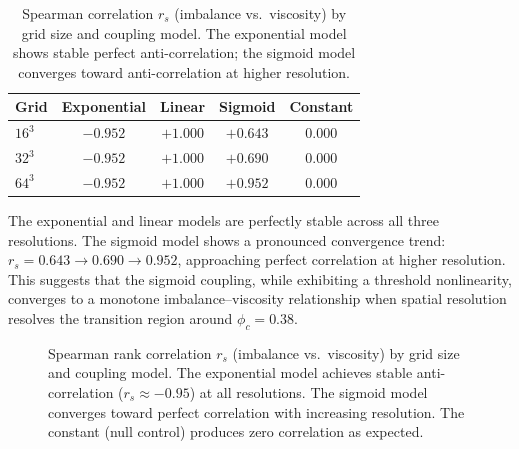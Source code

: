 \documentclass[12pt]{article}
\theoremstyle{definition}
\theoremstyle{plain}
\theoremstyle{remark}
\begin{document}
\begin{table}[htbp]
\centering
\caption{Spearman correlation $r_s$ (imbalance vs.\ viscosity) by grid
size and coupling model.  The exponential model shows stable perfect
anti-correlation; the sigmoid model converges toward anti-correlation at
higher resolution.}
\label{tab:spearman}
\begin{tabular}{lcccc}
\toprule
\textbf{Grid} & \textbf{Exponential} & \textbf{Linear} &
  \textbf{Sigmoid} & \textbf{Constant} \\
\midrule
$16^3$ & $-0.952$ & $+1.000$ & $+0.643$ & $0.000$ \\
$32^3$ & $-0.952$ & $+1.000$ & $+0.690$ & $0.000$ \\
$64^3$ & $-0.952$ & $+1.000$ & $+0.952$ & $0.000$ \\
\bottomrule
\end{tabular}
\end{table}

The exponential and linear models are perfectly stable across all three
resolutions.  The sigmoid model shows a pronounced convergence trend:
$r_s = 0.643 \to 0.690 \to 0.952$, approaching perfect correlation at
higher resolution.  This suggests that the sigmoid coupling, while
exhibiting a threshold nonlinearity, converges to a monotone
imbalance--viscosity relationship when spatial resolution resolves the
transition region around $\phi_c = 0.38$.

\begin{figure}[htbp]
\centering
{}
\caption{Spearman rank correlation $r_s$ (imbalance vs.\ viscosity) by
grid size and coupling model.  The exponential model achieves stable
anti-correlation ($r_s \approx -0.95$) at all resolutions.  The sigmoid
model converges toward perfect correlation with increasing resolution.
The constant (null control) produces zero correlation as expected.}
\label{fig:spearman}
\end{figure}
\end{document}
